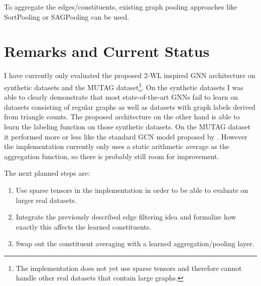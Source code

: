 \documentclass[12pt]{scrartcl}
\begin{document}
To aggregate the edges/constituents, existing graph pooling approaches like SortPooling or SAGPooling can be used.

\section{Remarks and Current Status}%
\label{sec:remarks}

I have currently only evaluated the proposed 2-WL inspired GNN architecture on synthetic datasets and the MUTAG dataset\footnote{
	The implementation does not yet use sparse tensors and therefore cannot handle other real datasets that contain large graphs.
}.
On the synthetic datasets I was able to clearly demonstrate that most state-of-the-art GNNs fail to learn on datasets consisting of regular graphs as well as datasets with graph labels derived from triangle counts.
The proposed architecture on the other hand is able to learn the labeling function on those synthetic datasets.
On the MUTAG dataset it performed more or less like the standard GCN model proposed by \citet{Kipf2017}.
However the implementation currently only uses a static arithmetic average as the aggregation function, so there is probably still room for improvement.

The next planned steps are:
\begin{enumerate}
	\item Use sparse tensors in the implementation in order to be able to evaluate on larger real datasets.
	\item Integrate the previously described edge filtering idea and formalize how exactly this affects the learned constituents.
	\item Swap out the constituent averaging with a learned aggregation/pooling layer.
\end{enumerate}

{%
\renewcommand{\bibfont}{\normalfont\small}
\setlength{\biblabelsep}{5pt}
\setlength{\bibitemsep}{0.5\baselineskip plus 0.5\baselineskip} %
\setcounter{biburllcpenalty}{9000}
\setcounter{biburlucpenalty}{9999}
\printbibliography%
}
\end{document}
